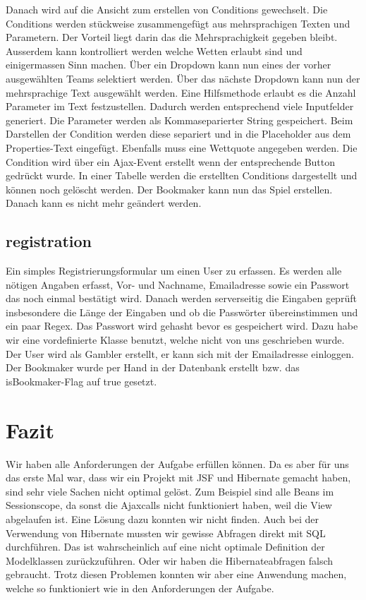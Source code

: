 \documentclass[a4paper, abstracton]{scrartcl}
\begin{document}
  Danach wird auf die Ansicht zum erstellen von Conditions gewechselt.
  Die Conditions werden stückweise zusammengefügt aus mehrsprachigen Texten und
  Parametern. Der Vorteil liegt darin das die Mehrsprachigkeit gegeben bleibt.
  Ausserdem kann kontrolliert werden welche Wetten erlaubt sind und einigermassen
  Sinn machen.
  Über ein Dropdown kann nun eines der vorher ausgewählten Teams selektiert
  werden. Über das nächste Dropdown kann nun der mehrsprachige Text ausgewählt werden.
  Eine Hilfsmethode erlaubt es die Anzahl Parameter im Text festzustellen.
  Dadurch werden entsprechend viele Inputfelder generiert. Die Parameter werden als
  Kommaseparierter String gespeichert. Beim Darstellen der Condition werden diese
  separiert und in die Placeholder aus dem Properties-Text eingefügt.
  Ebenfalls muss eine Wettquote angegeben werden.
  Die Condition wird über ein Ajax-Event erstellt wenn der entsprechende Button
  gedrückt wurde. In einer Tabelle werden die erstellten Conditions dargestellt
  und können noch gelöscht werden.
  Der Bookmaker kann nun das Spiel erstellen. Danach kann es nicht mehr geändert werden.
  
\subsection{registration}
  Ein simples Registrierungsformular um einen User zu erfassen. Es werden alle nötigen
  Angaben erfasst, Vor- und Nachname, Emailadresse sowie ein Passwort das noch
  einmal bestätigt wird.
  Danach werden serverseitig die Eingaben geprüft insbesondere die Länge der Eingaben
  und ob die Passwörter übereinstimmen und ein paar Regex.
  Das Passwort wird gehasht bevor es gespeichert wird. Dazu habe wir eine vordefinierte Klasse benutzt, welche nicht von uns geschrieben wurde.
  Der User wird als Gambler erstellt, er kann sich mit der Emailadresse einloggen.
  Der Bookmaker wurde per Hand in der Datenbank erstellt bzw. das isBookmaker-Flag auf true gesetzt.

\section{Fazit}
Wir haben alle Anforderungen der Aufgabe erfüllen können. Da es aber für uns das erste Mal war, dass wir ein Projekt mit JSF und Hibernate gemacht haben, sind sehr viele Sachen nicht optimal gelöst.
Zum Beispiel sind alle Beans im Sessionscope, da sonst die Ajaxcalls nicht funktioniert haben, weil die View abgelaufen ist. Eine Lösung dazu konnten wir nicht finden.
Auch bei der Verwendung von Hibernate mussten wir gewisse Abfragen direkt mit SQL durchführen. Das ist wahrscheinlich auf eine nicht optimale Definition der Modelklassen zurückzuführen. Oder wir haben die Hibernateabfragen falsch gebraucht.
Trotz diesen Problemen konnten wir aber eine Anwendung machen, welche so funktioniert wie in den Anforderungen der Aufgabe.
\end{document}
